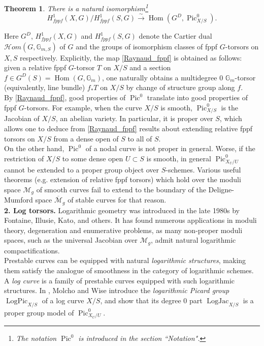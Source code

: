\documentclass[a4paper,11pt]{amsart} %
\numberwithin{equation}{subsection}
\newcommand{\on}[1]{\operatorname{#1}}
\newcommand{\bb}[1]{{\mathbb{#1}}}
\newcommand{\ca}[1]{{\mathcal{#1}}}
\newcommand{\lra}{\longrightarrow}
\newcommand{\iso}{\stackrel{\sim}{\lra}}
\def\Pic{\operatorname{Pic}}
\def\o#1{\overline{#1}}
\theoremstyle{definition}
\theoremstyle{plain}%
\newtheorem{theorem}[definition]{Theorem}
\theoremstyle{remark}
\begin{document}
\begin{theorem}\label{Rynaud-fppf}
  There is a natural isomorphism\footnote{The notation $\on{Pic}^0$ is introduced in the section ``Notation".}
 \begin{equation}\label{Raynaud_fppf}
H^1_{fppf}(X,G)/H^1_{fppf}(S,G)
\iso \operatorname{Hom}(G^D, \on{Pic}^0_{X/S}).
 \end{equation}

\end{theorem}

Here $G^D$, $H^1_{fppf}(X,G)$ and $H^1_{fppf}(S,G)$ denote the Cartier dual $\ca{H}om(G,\bb G_{m,S})$ of $G$ and the groups of isomorphism classes of fppf $G$-torsors on $X,S$ respectively. Explicitly, the map \ref{Raynaud_fppf} is obtained as follows: given a relative fppf $G$-torsor $T$ on $X/S$ and a section $f \in G^D(S)=\on{Hom}(G,\bb G_m)$, one naturally obtains a multidegree $0$  $\bb G_m$-torsor (equivalently, line bundle) $f_*T$ on $X/S$ by change of structure group along $f$.\\

By \ref{Raynaud_fppf}, good properties of $\on{Pic}^0$ translate into good properties of fppf $G$-torsors. For example, when the curve $X/S$ is smooth, $\on{Pic}^0_{X/S}$ is the Jacobian of $X/S$, an abelian variety. In particular, it is proper over $S$, which allows one to deduce from \ref{Raynaud_fppf} results about extending relative fppf torsors on $X/S$ from a dense open of $S$ to all of $S$.\\

On the other hand, $\Pic^0$ of a nodal curve is not proper in general. Worse, if the restriction of $X/S$ to some dense open $U \subset S$ is smooth, in general $\on{Pic}^0_{X_U/U}$ cannot be extended to a proper group object over $S$-schemes. Various useful theorems (e.g. extension of relative fppf torsors) which hold over the moduli space $\ca M_g$ of smooth curves fail to extend to the boundary of the Deligne-Mumford space $\o{\ca M}_g$ of stable curves for that reason.\\


\noindent\textbf{2. Log torsors.} Logarithmic geometry was introduced in the late 1980s by Fontaine, Illusie, Kato, and others. It has found numerous applications in moduli theory, degeneration and enumerative problems, as many non-proper moduli spaces, such as the universal Jacobian over $\ca M_g$, admit natural logarithmic compactifications.\\

Prestable curves can be equipped with natural \emph{logarithmic structures}, making them satisfy the analogue of smoothness in the category of logarithmic schemes. A \emph{log curve} is a family of prestable curves equipped with such logarithmic structures. In \cite{molcho_wise_2022}, Molcho and Wise introduce the \emph{logarithmic Picard group} $\on{LogPic}_{X/S}$ of a log curve $X/S$, and show that its degree $0$ part $\on{LogJac}_{X/S}$ is a proper group model of $\on{Pic}^0_{X_U/U}$.
\end{document}
